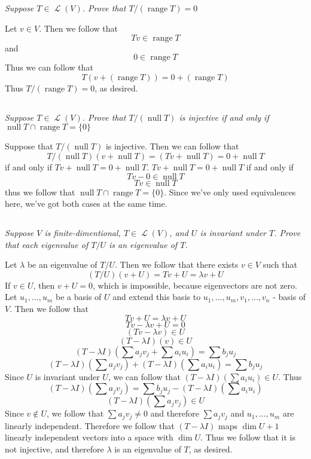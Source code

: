 \documentclass[11pt,oneside,titlepage]{book}
\DeclareMathOperator \map {\mathcal {L}}
\DeclareMathOperator \ns {null}
\DeclareMathOperator \range {range}
\begin{document}
\subsection{}

\textit{Suppose $T \in \map(V)$. Prove that $T/(\range T) = 0$}

Let $v \in V$. Then we follow that
$$Tv \in \range T$$
and
$$0 \in \range T$$
Thus we can follow that
$$T(v + (\range T)) = 0 + (\range T)$$
Thus $T/(\range T) = 0$, as desired.


\subsection{}

\textit{Suppose $T \in \map(V)$. Prove that $T/(\ns T)$ is injective if and only if
  $\ns T \cap \range T = \{0\}$}

Suppose that $T/(\ns T)$ is injective. Then we can follow that
$$T/(\ns T)(v + \ns T) = (Tv + \ns T) = 0 + \ns T$$
if and only if $Tv + \ns T = 0 + \ns T$. $Tv + \ns T = 0 + \ns T$ if and only if
$$Tv - 0\in \ns T$$
$$Tv \in \ns T$$
thus we follow that $\ns T \cap \range T = \{0\}$. Since we've only used equivalences here,
we've got both cases at the same time.

\subsection{}

\textit{Suppose $V$ is finite-dimentional, $T \in \map(V)$, and $U$ is invariant under $T$. Prove
  that each eigenvalue of $T/U$ is an eigenvalue of $T$.}

Let $\lambda$ be an eigenvalue of $T/U$. Then we follow that there exists $v \in V$ such that
$$(T/U)(v + U) = Tv + U = \lambda v + U $$
If $v \in U$, then $v + U = 0$, which is impossible, because eigenvectors are not zero.
Let $u_1, ..., u_m$ be a basis of $U$ and extend this basis to $u_1, ..., u_m, v_1, ..., v_n$ -
basis of $V$. Then we follow that
$$Tv + U = \lambda v + U $$
$$Tv - \lambda v + U = 0$$
$$(Tv - \lambda v) \in U$$
$$(T - \lambda I) (v) \in U$$
$$(T - \lambda I) (\sum {a_j v_j} + \sum {a_i u_i}) = \sum{b_j u_j}$$
$$(T - \lambda I) (\sum {a_j v_j})  + (T - \lambda I) (\sum {a_i u_i}) = \sum{b_j u_j}$$
Since $U$ is invariant under $U$, we can follow that $(T - \lambda I) (\sum {a_i u_i}) \in U$.
Thus
$$(T - \lambda I) (\sum {a_j v_j}) = \sum{b_j u_j} -  (T - \lambda I) (\sum {a_i u_i})$$
$$(T - \lambda I) (\sum {a_j v_j}) \in U$$
Since $v \notin U$, we follow that $\sum {a_j v_j} \neq 0$ and therefore $\sum {a_j v_j}$ and
$u_1, ..., u_m$ are linearly independent. 
Therefore we follow that  $(T - \lambda I)$ maps $\dim U + 1$ linearly independent vectors
into a space with $\dim U$. Thus we follow that it is not injective, and therefore
$\lambda$ is an eigenvalue of $T$, as desired.
\end{document}
